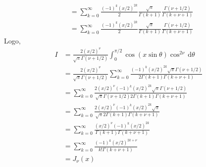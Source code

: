 \documentclass[a4paper,12pt, leqno, answers]{exam}
\begin{document}
\begin{questions}
\begin{solution}
\begin{align*}
            &= \sum_{k = 0}^\infty \frac{(-1)^k (x/2)^{2k}}{2} \frac{\sqrt{\pi}}{\Gamma(k + 1)} \frac{\Gamma(\nu + 1/2)}{\Gamma(k + \nu + 1)} \\
            &= \sum_{k = 0}^\infty \frac{(-1)^k (x/2)^{2k}}{2} \frac{\sqrt{\pi}}{\Gamma(k + 1)} \frac{\Gamma(\nu + 1/2)}{\Gamma(k + \nu + 1)}
        \end{align*}
        Logo,
        \begin{align*}
            I &= \frac{2 (x/2)^\nu}{\sqrt{\pi} \Gamma(\nu + 1/2)} \int_0^{\pi/2} \cos(x \sin \theta) \cos^{2 \nu} \,\mathrm{d}\theta \\
            &= \frac{2 (x/2)^\nu}{\sqrt{\pi} \Gamma(\nu + 1/2)} \sum_{k = 0}^\infty \frac{(-1)^k (x/2)^{2k} \sqrt{\pi} \Gamma(\nu + 1/2)}{2 \Gamma(k + 1) \Gamma(k + \nu + 1)} \\
            &= \sum_{k = 0}^\infty \frac{2 (x/2)^\nu (-1)^k (x/2)^{2k} \sqrt{\pi} \Gamma(\nu + 1/2)}{\sqrt{\pi} \Gamma(\nu + 1/2) 2 \Gamma(k + 1) \Gamma(k + \nu + 1)} \\
            &= \sum_{k = 0}^\infty \frac{2 (x/2)^\nu (-1)^k (x/2)^{2k} \sqrt{\pi}}{\sqrt{\pi} 2 \Gamma(k + 1) \Gamma(k + \nu + 1)} \\
            &= \sum_{k = 0}^\infty \frac{(x/2)^\nu (-1)^k (x/2)^{2k}}{\Gamma(k + 1) \Gamma(k + \nu + 1)} \\
            &= \sum_{k = 0}^\infty \frac{(-1)^k (x/2)^{2k + \nu}}{k! \Gamma(k + \nu + 1)} \\
            &= J_\nu(x)
        \end{align*}
    \end{solution}


\end{questions}
\end{document}
